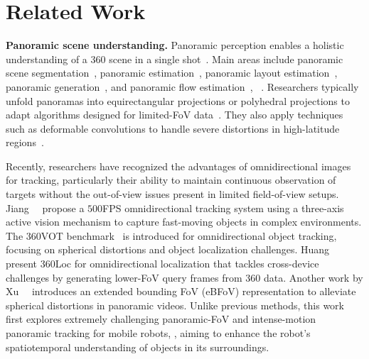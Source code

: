 \section{Related Work}
\label{sec:related_works}


\noindent\textbf{Panoramic scene understanding.}
Panoramic perception enables a holistic understanding of a 360{\textdegree} scene in a single shot~\cite{gao2022review,chen2024360+,dong2024panocontext,ehsanpour2022jrdb_act,jiang2024minimalist,jiang2022annular,ai2022deep}. 
Main areas include 
panoramic scene segmentation~\cite{teng2024360bev,zheng2024360sfuda++,cao2024occlusion,zheng2024semantics,yan2023panovos,jaus2021panoramic_panoptic,jaus2023panoramic_insights}, 
panoramic estimation~\cite{bai2024glpanodepth,ai2024elite360d,wang2022bifuse++,shen2022panoformer,chang2023depth_neural}, 
panoramic layout estimation~\cite{yu2023panelnet,shen2023disentangling,ling2023panoswin}, 
panoramic generation~\cite{zhou2025dreamscene360,wang2024360dvd,li2023panogen}, 
and panoramic flow estimation~\cite{shi2023panoflow,li2022deep}, \etc~\cite{park2024fully,kim2024fully,fan2024learned,han2022panoramic_activity}.
Researchers typically unfold panoramas into equirectangular projections or polyhedral projections to adapt algorithms designed for limited-FoV data~\cite{jiang2021unifuse,wang2022bifuse++,li2022deep}. 
They also apply techniques such as deformable convolutions to handle severe distortions in high-latitude regions~\cite{shi2023panoflow,zhang2024behind}.

Recently, researchers have recognized the advantages of omnidirectional images for tracking, particularly their ability to maintain continuous observation of targets without the out-of-view issues present in limited field-of-view setups.
Jiang~\etal~\cite{jiang2021500} propose a $500$FPS omnidirectional tracking system using a three-axis active vision mechanism to capture fast-moving objects in complex environments.
The 360VOT benchmark~\cite{huang2023360vot} is introduced for omnidirectional object tracking, focusing on spherical distortions and object localization challenges.
Huang~\etal~\cite{huang2024360loc} present 360Loc for omnidirectional localization that tackles cross-device challenges by generating lower-FoV query frames from 360{\textdegree} data. 
Another work by Xu~\etal~\cite{xu2024360vots} introduces an extended bounding FoV (eBFoV) representation to alleviate spherical distortions in panoramic videos.
Unlike previous methods, this work first explores extremely challenging panoramic-FoV and intense-motion panoramic tracking for mobile robots, \eg, aiming to enhance the robot’s spatiotemporal understanding of objects in its surroundings.

